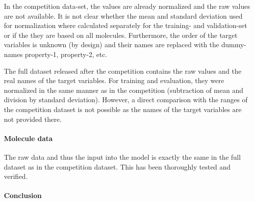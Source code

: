 In the competition data-set, the values are already normalized and the raw values are not available. It is not clear whether the mean and standard deviation used for normalization where calculated separately for the training- and validation-set or if the they are based on all molecules. Furthermore, the order of the target variables is unknown (by design) and their names are replaced with the dummy-names property-1, property-2, etc.

The full dataset released after the competition contains the raw values and the real names of the target variables. For training and evaluation, they were normalized in the same manner as in the competition (subtraction of mean and division by standard deviation). However, a direct comparison with the ranges of the competition dataset is not possible as the names of the target variables are not provided there. 


\paragraph{Molecule data}

The raw data and thus the input into the model is exactly the same in the full dataset as in the competition dataset. This has been thoroughly tested and verified.

\paragraph{Conclusion}

